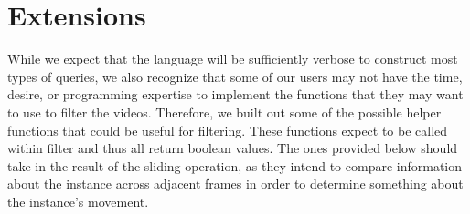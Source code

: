 
\section{Extensions}

While we expect that the language will be sufficiently verbose to construct most types of queries, we also recognize that some of our users may not have the time, desire, or programming expertise to implement the functions that they may want to use to filter the videos. Therefore, we built out some of the possible helper functions that could be useful for filtering. These functions expect to be called within filter and thus all return boolean values. The ones provided below should take in the result of the sliding operation, as they intend to compare information about the instance across adjacent frames in order to determine something about the instance's movement.

